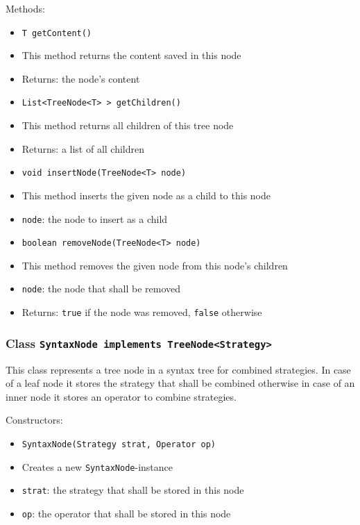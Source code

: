 \documentclass[parskip=full,11pt]{scrartcl}
\begin{document}
Methods:
\begin{itemize}\itemsep -10pt
	\item \texttt{T getContent()}
	\item[] This method returns the content saved in this node
	\item[] Returns: the node's content

	\item \texttt{List<TreeNode<T>\,> getChildren()}
	\item[] This method returns all children of this tree node
	\item[] Returns: a list of all children

	\item \texttt{void insertNode(TreeNode<T> node)}
	\item[] This method inserts the given node as a child to this node
	\item[] \texttt{node}: the node to insert as a child

	\item \texttt{boolean removeNode(TreeNode<T> node)}
	\item[] This method removes the given node from this node's children
	\item[] \texttt{node}: the node that shall be removed
	\item[] Returns: \texttt{true} if the node was removed, \texttt{false} otherwise
\end{itemize}

\subsubsection{Class \texttt{SyntaxNode implements TreeNode<Strategy>}}

This class represents a tree node in a syntax tree for combined strategies. In case of a leaf node it stores the strategy that shall be combined otherwise in case of an inner node it stores an operator to combine strategies.

Constructors:
\begin{itemize} \itemsep -10pt
	\item \texttt{SyntaxNode(Strategy strat, Operator op)}
	\item[] Creates a new \texttt{SyntaxNode}-instance
	\item[] \texttt{strat}: the strategy that shall be stored in this node
	\item[] \texttt{op}: the operator that shall be stored in this node
\end{itemize}
\end{document}
